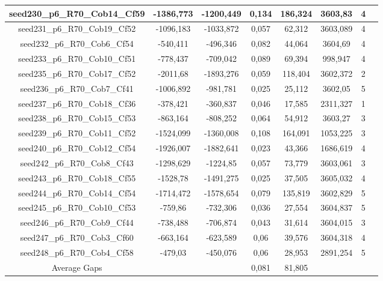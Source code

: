 \documentclass[a4paper]{article}
\begin{document}
\begin{center}
\begin{longtable}{cccccccc}
\hline
seed230\_p6\_R70\_Cob14\_Cf59 & -1386,773 & -1200,449 & 0,134 & 186,324 & 3603,83 & 4\\
\hline
seed231\_p6\_R70\_Cob19\_Cf52 & -1096,183 & -1033,872 & 0,057 & 62,312 & 3603,089 & 4\\
\hline
seed232\_p6\_R70\_Cob6\_Cf54 & -540,411 & -496,346 & 0,082 & 44,064 & 3604,69 & 4\\
\hline
seed233\_p6\_R70\_Cob10\_Cf51 & -778,437 & -709,042 & 0,089 & 69,394 & 998,947 & 4\\
\hline
seed235\_p6\_R70\_Cob17\_Cf52 & -2011,68 & -1893,276 & 0,059 & 118,404 & 3602,372 & 2\\
\hline
seed236\_p6\_R70\_Cob7\_Cf41 & -1006,892 & -981,781 & 0,025 & 25,112 & 3602,05 & 5\\
\hline
seed237\_p6\_R70\_Cob18\_Cf36 & -378,421 & -360,837 & 0,046 & 17,585 & 2311,327 & 1\\
\hline
seed238\_p6\_R70\_Cob15\_Cf53 & -863,164 & -808,252 & 0,064 & 54,912 & 3603,27 & 3\\
\hline
seed239\_p6\_R70\_Cob11\_Cf52 & -1524,099 & -1360,008 & 0,108 & 164,091 & 1053,225 & 3\\
\hline
seed240\_p6\_R70\_Cob12\_Cf54 & -1926,007 & -1882,641 & 0,023 & 43,366 & 1686,619 & 4\\
\hline
seed242\_p6\_R70\_Cob8\_Cf43 & -1298,629 & -1224,85 & 0,057 & 73,779 & 3603,061 & 3\\
\hline
seed243\_p6\_R70\_Cob18\_Cf55 & -1528,78 & -1491,275 & 0,025 & 37,505 & 3605,032 & 4\\
\hline
seed244\_p6\_R70\_Cob14\_Cf54 & -1714,472 & -1578,654 & 0,079 & 135,819 & 3602,829 & 5\\
\hline
seed245\_p6\_R70\_Cob10\_Cf53 & -759,86 & -732,306 & 0,036 & 27,554 & 3604,837 & 5\\
\hline
seed246\_p6\_R70\_Cob9\_Cf44 & -738,488 & -706,874 & 0,043 & 31,614 & 3604,015 & 3\\
\hline
seed247\_p6\_R70\_Cob3\_Cf60 & -663,164 & -623,589 & 0,06 & 39,576 & 3604,318 & 4\\
\hline
seed248\_p6\_R70\_Cob4\_Cf58 & -479,03 & -450,076 & 0,06 & 28,953 & 2891,254 & 5\\
\hline
\hline
Average Gaps & & & 0,081 & 81,805 & & \\
\hline
\hline
\end{longtable}
\end{center}
\end{document}
